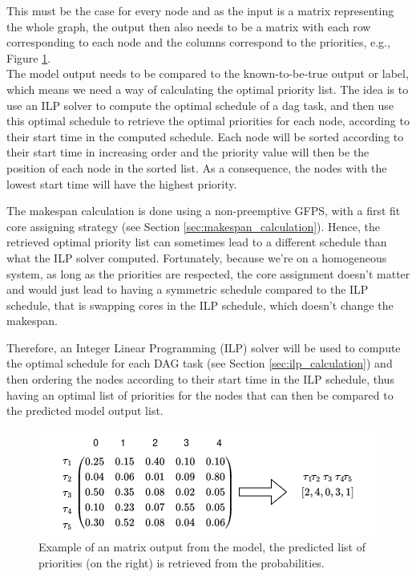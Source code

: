 This must be the case for every node and as the input 
is a matrix representing the whole graph, 
the output then also needs to be a matrix with 
each row corresponding to each node and the columns
correspond to the priorities, e.g., Figure \ref{fig:dag_output_matrix_example}.
\\

The model output needs to be compared to the known-to-be-true output or label,
which means we need a way of calculating the optimal priority list.
The idea is to use an ILP solver to compute the optimal schedule 
of a dag task, and then use this optimal schedule to retrieve 
the optimal priorities for each node, according to their start time
in the computed schedule.
Each node will be sorted according to their start time in increasing order
and the priority value will then be the position of each node in the sorted list.
As a consequence, the nodes with the lowest start time will
have the highest priority.

The makespan calculation is done using a non-preemptive GFPS,
with a first fit core assigning strategy (see Section \ref{sec:makespan_calculation}). Hence,
the retrieved optimal priority list can sometimes 
lead to a different schedule than what the ILP solver computed.
Fortunately, because we're on a homogeneous system,
as long as the priorities are respected, the core assignment 
doesn't matter and would just lead to having a symmetric schedule
compared to the ILP schedule,
that is swapping cores in the ILP schedule, which doesn't change the makespan.

Therefore, an Integer Linear Programming (ILP) solver will be used to compute
the optimal schedule for each DAG task (see Section \ref{sec:ilp_calculation}) and then
ordering the nodes according to their start time in the ILP schedule,
thus having an optimal list of priorities for the nodes that can then be compared to
the predicted model output list.

\begin{figure}
    \centering
    \includegraphics[width=\linewidth]{images/output_matrix_example.drawio.png}
    \caption{Example of an matrix output from the model, the predicted list of priorities (on the right)
    is retrieved from the probabilities.}
    \label{fig:dag_output_matrix_example}
\end{figure}


